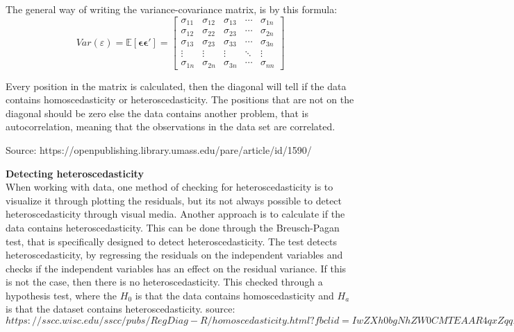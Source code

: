 The general way of writing the variance-covariance matrix, is by this formula:
\[
Var(\varepsilon) = \mathbb{E}[\boldsymbol{\epsilon} \boldsymbol{\epsilon}'] = 
\left[
\begin{array}{ccccc}
	\sigma_{11} & \sigma_{12} & \sigma_{13} & \cdots & \sigma_{1n} \\
	\sigma_{12} & \sigma_{22} & \sigma_{23} & \cdots & \sigma_{2n} \\
	\sigma_{13} & \sigma_{23} & \sigma_{33} & \cdots & \sigma_{3n} \\
	\vdots      & \vdots      & \vdots      & \ddots & \vdots      \\
	\sigma_{1n} & \sigma_{2n} & \sigma_{3n} & \cdots & \sigma_{nn}
\end{array}
\right]
\]

Every position in the matrix is calculated, then the diagonal will tell if the data contains homoscedasticity or heteroscedasticity. The positions that are not on the diagonal should be zero else the data contains another problem, that is autocorrelation, meaning that the observations in the data set are correlated.

Source: https://openpublishing.library.umass.edu/pare/article/id/1590/

\noindent \textbf{Detecting heteroscedasticity} \\
When working with data, one method of checking for heteroscedasticity is to visualize it through plotting the residuals, but its not always possible to detect heteroscedasticity through visual media. Another approach is to calculate if the data contains heteroscedasticity. This can be done through the Breusch-Pagan test, that is specifically designed to detect heteroscedasticity. The test detects heteroscedasticity, by regressing the residuals on the independent variables and checks if the independent variables has an effect on the residual variance. If this is not the case, then there is no heteroscedasticity. This checked through a hypothesis test, where the $H_0$ is that the data contains homoscedasticity and $H_a$ is that the dataset contains heteroscedasticity.
source: $https://sscc.wisc.edu/sscc/pubs/RegDiag-R/homoscedasticity.html?fbclid=IwZXh0bgNhZW0CMTEAAR4qxZqqD0CVoqZfHgWZU8lUOuxg43dFRSs9Opswn-IAo8l-UaO1oDWCuUfkvw_aem_9Ft7wkFWKUHycQ1GnX-x0g$

